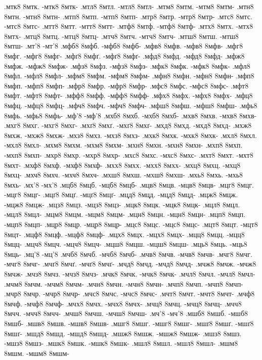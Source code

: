 {.мтк8 8мтк. -мтк8 8мтк-
.мтл8 8мтл. -мтл8 8мтл-
.мтм8 8мтм. -мтм8 8мтм-
.мтн8 8мтн. -мтн8 8мтн-
.мтп8 8мтп. -мтп8 8мтп-
.мтр8 8мтр. -мтр8 8мтр-
.мтс8 8мтс. -мтс8 8мтс-
.мтт8 8мтт. -мтт8 8мтт-
.мтф8 8мтф. -мтф8 8мтф-
.мтх8 8мтх. -мтх8 8мтх-
.мтц8 8мтц. -мтц8 8мтц-
.мтч8 8мтч. -мтч8 8мтч-
.мтш8 8мтш. -мтш8 8мтш-
.мт'8 -мт'8
.мфб8 8мфб. -мфб8 8мфб-
.мфв8 8мфв. -мфв8 8мфв-
.мфг8 8мфг. -мфг8 8мфг-
.мфґ8 8мфґ. -мфґ8 8мфґ-
.мфд8 8мфд. -мфд8 8мфд-
.мфж8 8мфж. -мфж8 8мфж-
.мфз8 8мфз. -мфз8 8мфз-
.мфк8 8мфк. -мфк8 8мфк-
.мфл8 8мфл. -мфл8 8мфл-
.мфм8 8мфм. -мфм8 8мфм-
.мфн8 8мфн. -мфн8 8мфн-
.мфп8 8мфп. -мфп8 8мфп-
.мфр8 8мфр. -мфр8 8мфр-
.мфс8 8мфс. -мфс8 8мфс-
.мфт8 8мфт. -мфт8 8мфт-
.мфф8 8мфф. -мфф8 8мфф-
.мфх8 8мфх. -мфх8 8мфх-
.мфц8 8мфц. -мфц8 8мфц-
.мфч8 8мфч. -мфч8 8мфч-
.мфш8 8мфш. -мфш8 8мфш-
.мфь8 8мфь. -мфь8 8мфь-
.мф'8 -мф'8
.мхб8 8мхб. -мхб8 8мхб-
.мхв8 8мхв. -мхв8 8мхв-
.мхг8 8мхг. -мхг8 8мхг-
.мхґ8 8мхґ. -мхґ8 8мхґ-
.мхд8 8мхд. -мхд8 8мхд-
.мхж8 8мхж. -мхж8 8мхж-
.мхз8 8мхз. -мхз8 8мхз-
.мхк8 8мхк. -мхк8 8мхк-
.мхл8 8мхл. -мхл8 8мхл-
.мхм8 8мхм. -мхм8 8мхм-
.мхн8 8мхн. -мхн8 8мхн-
.мхп8 8мхп. -мхп8 8мхп-
.мхр8 8мхр. -мхр8 8мхр-
.мхс8 8мхс. -мхс8 8мхс-
.мхт8 8мхт. -мхт8 8мхт-
.мхф8 8мхф. -мхф8 8мхф-
.мхх8 8мхх. -мхх8 8мхх-
.мхц8 8мхц. -мхц8 8мхц-
.мхч8 8мхч. -мхч8 8мхч-
.мхш8 8мхш. -мхш8 8мхш-
.мхь8 8мхь. -мхь8 8мхь-
.мх'8 -мх'8
.мцб8 8мцб. -мцб8 8мцб-
.мцв8 8мцв. -мцв8 8мцв-
.мцг8 8мцг. -мцг8 8мцг-
.мцґ8 8мцґ. -мцґ8 8мцґ-
.мцд8 8мцд. -мцд8 8мцд-
.мцж8 8мцж. -мцж8 8мцж-
.мцз8 8мцз. -мцз8 8мцз-
.мцк8 8мцк. -мцк8 8мцк-
.мцл8 8мцл. -мцл8 8мцл-
.мцм8 8мцм. -мцм8 8мцм-
.мцн8 8мцн. -мцн8 8мцн-
.мцп8 8мцп. -мцп8 8мцп-
.мцр8 8мцр. -мцр8 8мцр-
.мцс8 8мцс. -мцс8 8мцс-
.мцт8 8мцт. -мцт8 8мцт-
.мцф8 8мцф. -мцф8 8мцф-
.мцх8 8мцх. -мцх8 8мцх-
.мцц8 8мцц. -мцц8 8мцц-
.мцч8 8мцч. -мцч8 8мцч-
.мцш8 8мцш. -мцш8 8мцш-
.мць8 8мць. -мць8 8мць-
.мц'8 -мц'8
.мчб8 8мчб. -мчб8 8мчб-
.мчв8 8мчв. -мчв8 8мчв-
.мчг8 8мчг. -мчг8 8мчг-
.мчґ8 8мчґ. -мчґ8 8мчґ-
.мчд8 8мчд. -мчд8 8мчд-
.мчж8 8мчж. -мчж8 8мчж-
.мчз8 8мчз. -мчз8 8мчз-
.мчк8 8мчк. -мчк8 8мчк-
.мчл8 8мчл. -мчл8 8мчл-
.мчм8 8мчм. -мчм8 8мчм-
.мчн8 8мчн. -мчн8 8мчн-
.мчп8 8мчп. -мчп8 8мчп-
.мчр8 8мчр. -мчр8 8мчр-
.мчс8 8мчс. -мчс8 8мчс-
.мчт8 8мчт. -мчт8 8мчт-
.мчф8 8мчф. -мчф8 8мчф-
.мчх8 8мчх. -мчх8 8мчх-
.мчц8 8мчц. -мчц8 8мчц-
.мчч8 8мчч. -мчч8 8мчч-
.мчш8 8мчш. -мчш8 8мчш-
.мч'8 -мч'8
.мшб8 8мшб. -мшб8 8мшб-
.мшв8 8мшв. -мшв8 8мшв-
.мшг8 8мшг. -мшг8 8мшг-
.мшґ8 8мшґ. -мшґ8 8мшґ-
.мшд8 8мшд. -мшд8 8мшд-
.мшж8 8мшж. -мшж8 8мшж-
.мшз8 8мшз. -мшз8 8мшз-
.мшк8 8мшк. -мшк8 8мшк-
.мшл8 8мшл. -мшл8 8мшл-
.мшм8 8мшм. -мшм8 8мшм-
}

